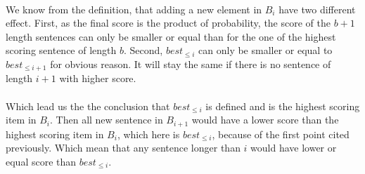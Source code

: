 \paragraph{}
We know from the definition, that adding a new element in $B_i$ have two different effect.
First, as the final score is the product of probability, the score of the $b+1$ length sentences can only be smaller or equal than for the one of the highest scoring sentence of length $b$.
Second, $best_{\leq i}$ can only be smaller or equal to $best_{\leq i + 1}$ for obvious reason.
It will stay the same if there is no sentence of length $i + 1$ with higher score.
\paragraph{}
Which lead us the the conclusion that $best_{\leq i}$ is defined and is the highest scoring item in $B_i$.
Then all new sentence in $B_{i+1}$ would have a lower score than the highest scoring item in $B_i$, which here is $best_{\leq i}$, because of the first point cited previously.
Which mean that any sentence longer than $i$ would have lower or equal score than $best_{\leq i}$.

